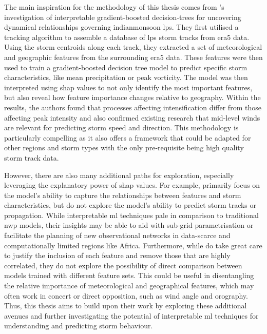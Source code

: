 The main inspiration for the methodology of this thesis comes from \cite{Hunt2024}'s investigation of interpretable gradient-boosted decision-trees for uncovering dynamical relationships governing \gls{indianmonsoon} \acrfull{lps}. They first utilised a tracking algorithm to assemble a database of \acrshort{lps} storm tracks from \acrshort{era5} data. Using the storm centroids along each track, they extracted a set of meteorological and geographic features from the surrounding \acrshort{era5} data. These features were then used to train a gradient-boosted decision tree model to predict specific storm characteristics, like mean precipitation or peak vorticity. The model was then interpreted using \acrshort{shap} values to not only identify the most important features, but also reveal how feature importance changes relative to geography. Within the results, the authors found that processes affecting intensification differ from those affecting peak intensity and also confirmed existing research that mid-level winds are relevant for predicting storm speed and direction. This methodology is particularly compelling as it also offers a framework that could be adapted for other regions and storm types with the only pre-requisite being high quality storm track data.

However, there are also many additional paths for exploration, especially leveraging the explanatory power of \acrshort{shap} values. For example, \cite{Hunt2024} primarily focus on the model's ability to capture the relationships between features and storm characteristics, but do not explore the model's ability to predict storm tracks or propagation. While interpretable \acrshort{ml} techniques pale in comparison to traditional \acrfull{nwp} models, their insights may be able to aid with sub-grid parametrisation or facilitate the planning of new observational networks in data-scarce and computationally limited regions like Africa. Furthermore, while \cite{Hunt2024} do take great care to justify the inclusion of each feature and remove those that are highly correlated, they do not explore the possibility of direct comparison between models trained with different feature sets. This could be useful in disentangling the relative importance of meteorological and geographical features, which may often work in concert or direct opposition, such as wind angle and orography. Thus, this thesis aims to build upon their work by exploring these additional avenues and further investigating the potential of interpretable \acrshort{ml} techniques for understanding and predicting storm behaviour.

